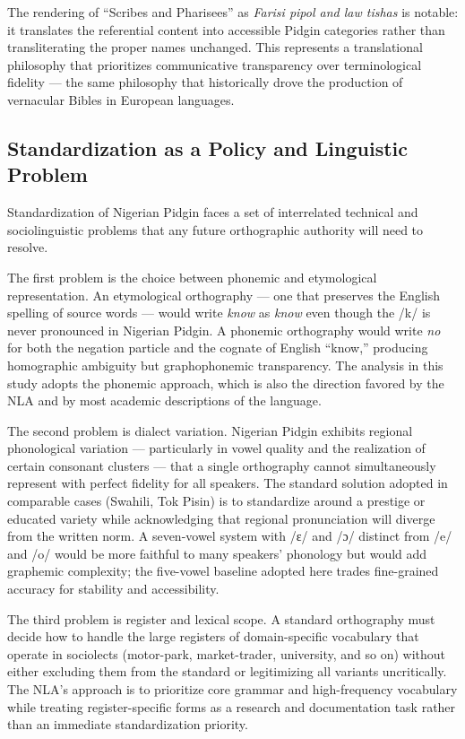 \documentclass[12pt]{article}
\begin{document}
The rendering of ``Scribes and Pharisees'' as \textit{Farisi pipol and law tishas} is notable: it translates the referential content into accessible Pidgin categories rather than transliterating the proper names unchanged. This represents a translational philosophy that prioritizes communicative transparency over terminological fidelity --- the same philosophy that historically drove the production of vernacular Bibles in European languages.

\subsection{Standardization as a Policy and Linguistic Problem}

Standardization of Nigerian Pidgin faces a set of interrelated technical and sociolinguistic problems that any future orthographic authority will need to resolve.

The first problem is the choice between phonemic and etymological representation. An etymological orthography --- one that preserves the English spelling of source words --- would write \textit{know} as \textit{know} even though the /k/ is never pronounced in Nigerian Pidgin. A phonemic orthography would write \textit{no} for both the negation particle and the cognate of English ``know,'' producing homographic ambiguity but graphophonemic transparency. The analysis in this study adopts the phonemic approach, which is also the direction favored by the NLA and by most academic descriptions of the language.

The second problem is dialect variation. Nigerian Pidgin exhibits regional phonological variation --- particularly in vowel quality and the realization of certain consonant clusters --- that a single orthography cannot simultaneously represent with perfect fidelity for all speakers. The standard solution adopted in comparable cases (Swahili, Tok Pisin) is to standardize around a prestige or educated variety while acknowledging that regional pronunciation will diverge from the written norm. A seven-vowel system with /ɛ/ and /ɔ/ distinct from /e/ and /o/ would be more faithful to many speakers' phonology but would add graphemic complexity; the five-vowel baseline adopted here trades fine-grained accuracy for stability and accessibility.

The third problem is register and lexical scope. A standard orthography must decide how to handle the large registers of domain-specific vocabulary that operate in sociolects (motor-park, market-trader, university, and so on) without either excluding them from the standard or legitimizing all variants uncritically. The NLA's approach is to prioritize core grammar and high-frequency vocabulary while treating register-specific forms as a research and documentation task rather than an immediate standardization priority.
\end{document}
